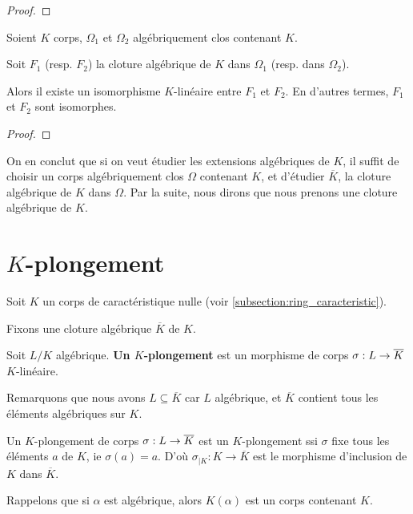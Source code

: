\ifdefined\outputproof
\begin{proof}

\end{proof}
\fi

\begin{corollary}
	Soient $K$ corps, $\Omega_{1}$ et $\Omega_{2}$ algébriquement clos contenant
	$K$.

	Soit $F_{1}$ (resp. $F_{2}$) la cloture algébrique de $K$ dans $\Omega_{1}$
	(resp. dans $\Omega_{2}$).

	Alors il existe un isomorphisme $K$-linéaire entre $F_{1}$ et
	$F_{2}$. En d'autres termes, $F_{1}$ et $F_{2}$ sont isomorphes.
\end{corollary}

\ifdefined\outputproof
\begin{proof}

\end{proof}
\fi

On en conclut que si on veut étudier les extensions algébriques de $K$, il
suffit de choisir un corps algébriquement clos $\Omega$ contenant $K$, et
d'étudier $\overline{K}$, la cloture algébrique de $K$ dans $\Omega$. Par la
suite, nous dirons que nous prenons une cloture algébrique de $K$.

\section{$K$-plongement}

Soit $K$ un corps de caractéristique nulle (voir
\ref{subsection:ring_caracteristic}).

Fixons une cloture algébrique $\overline{K}$ de $K$.

\begin{definition}
	Soit $L/K$ algébrique.
	\textbf{Un $K$-plongement} est un morphisme de corps
	$\sigma : L \rightarrow \overline{K}$ $K$-linéaire.
\end{definition}

Remarquons que nous avons $L \subseteq \overline{K}$ car $L$ algébrique, et
$\overline{K}$ contient tous les éléments algébriques sur $K$.

Un $K$-plongement de corps $\sigma : L \rightarrow \overline{K}$ est un
$K$-plongement ssi $\sigma$ fixe tous les éléments $a$ de $K$, ie $\sigma(a) =
a$.
D'où $\sigma_{|K} : K \rightarrow \overline{K}$ est le morphisme
d'inclusion de $K$ dans $\overline{K}$.

Rappelons que si $\alpha$ est algébrique, alors $K(\alpha)$ est un corps
contenant $K$.

